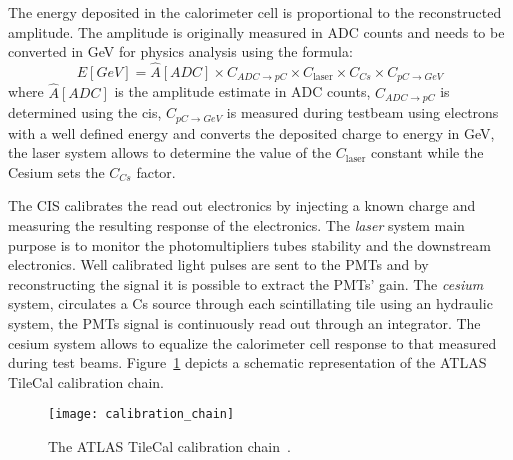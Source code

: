 The energy deposited in the calorimeter cell is proportional to the
reconstructed amplitude. The amplitude is originally measured in ADC counts and
needs to be converted in GeV for physics analysis using the formula:
\begin{equation}
  \label{eq:84}
  E[GeV] = \hat{A}[ADC] \times C_{ADC \rightarrow pC} \times C_{\text{laser}}
  \times C_{Cs} \times C_{pC \rightarrow GeV}
\end{equation}
where $\hat{A}[ADC]$ is the amplitude estimate in ADC counts, $C_{ADC \rightarrow
pC}$ is determined using the \gls{cis}, $C_{pC \rightarrow
  GeV}$ is measured during testbeam using electrons with a well defined energy
and converts the deposited charge to energy in GeV, the laser system allows to
determine the value of the $C_{\text{laser}}$ constant while the Cesium sets the
$C_{Cs}$ factor.

The CIS calibrates the read out electronics by injecting a known charge and
measuring the resulting response of the electronics. The \emph{laser} system
main purpose is to monitor the photomultipliers tubes stability and the
downstream electronics. Well calibrated light pulses are sent to the PMTs and by
reconstructing the signal it is possible to extract the PMTs' gain. The
\emph{cesium} system, circulates a Cs source through each scintillating tile
using an hydraulic system, the PMTs signal is continuously read out through an
integrator. The cesium system allows to equalize the calorimeter cell response
to that measured during test beams. Figure~\ref{fig:cali_chain} depicts a
schematic representation of the ATLAS TileCal calibration chain.

\begin{figure}[!h]
  \centering
    \texttt{[image: calibration\_chain]}
    \caption{The ATLAS TileCal calibration chain~\cite{TileCalibChain}.}
    \label{fig:cali_chain}
\end{figure}
